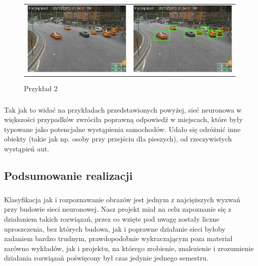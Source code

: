 \documentclass{article}
\begin{document}
\begin{figure}
\begin{center}
\begin{tabular}[c]{c c}
\includegraphics[scale=0.4]{MWSnap053.jpg} &
\includegraphics[scale=0.4]{11304256_994387423904964_745363915_n.jpg}
\end{tabular}
\end{center}
\caption{Przykład 2}
\label{fig:przyklad_2}
\end{figure}

\subparagraph{} Tak jak to widać na przykładach przedstawionych powyżej, sieć neuronowa w większości przypadków zwróciła poprawną odpowiedź w miejscach, które były typowane jako potencjalne wystąpienia samochodów. Udało się odróżnić inne obiekty (takie jak np. osoby przy przejściu dla pieszych), od rzeczywistych wystąpień aut.

\subsection{Podsumowanie realizacji}
\subparagraph{} Klasyfikacja jak i rozpoznawanie obrazów jest jednym z najcięższych wyzwań przy budowie sieci neuronowej. Nasz projekt miał na celu zapoznanie się z działaniem takich rozwiązań, przez co wzięte pod uwagę zostały liczne uproszczenia, bez których budowa, jak i poprawne działanie sieci byłoby zadaniem bardzo trudnym, prawdopodobnie wykraczającym poza materiał zarówno wykładów, jak i projektu, na którego zrobienie, znalezienie i zrozumienie działania rozwiązań poświęcony był czas jedynie jednego semestru. 


\newpage
\listoffigures
\end{document}
